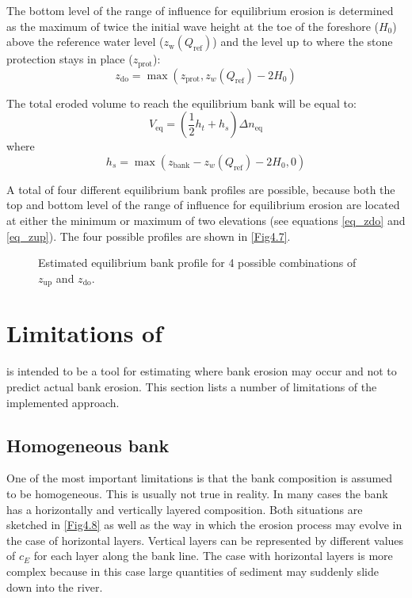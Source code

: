 The bottom level of the range of influence for equilibrium erosion is determined as the maximum of twice the initial wave height at the toe of the foreshore ($H_0$) above the reference water level ($z_\text{w}(Q_\text{ref})$) and the level up to where the stone protection stays in place ($z_\text{prot}$):
\begin{equation}
z_\text{do} = \max (z_\text{prot}, z_w(Q_\text{ref}) - 2 H_0 )
\label{eq_zdo}
\end{equation}

The total eroded volume to reach the equilibrium bank will be equal to:
\begin{equation}
V_\text{eq} = ( \frac{1}{2} h_t + h_s ) \Delta n_\text{eq}
\end{equation}
where
\begin{equation}
h_s = \max ( z_\text{bank} - z_w(Q_\text{ref}) - 2 H_0, 0)
\end{equation}

A total of four different equilibrium bank profiles are possible, because both the top and bottom level of the range of influence for equilibrium erosion are located at either the minimum or maximum of two elevations (see equations \autoref{eq_zdo} and \autoref{eq_zup}). The four possible profiles are shown in \autoref{Fig4.7}.
\begin{figure}[!h]
\center
\resizebox{14cm}{!}{
   
}
\caption{Estimated equilibrium bank profile for 4 possible combinations of $z_\text{up}$ and $z_\text{do}$.}
\label{Fig4.7}
\end{figure}

\section{Limitations of \dfastbe} \label{Sec4.7}

\dfastbe is intended to be a tool for estimating where bank erosion may occur and not to predict actual bank erosion.
This section lists a number of limitations of the implemented approach.

\subsection{Homogeneous bank}

One of the most important limitations is that the bank composition is assumed to be homogeneous.
This is usually not true in reality.
In many cases the bank has a horizontally and vertically layered composition.
Both situations are sketched in \autoref{Fig4.8} as well as the way in which the erosion process may evolve in the case of horizontal layers.
Vertical layers can be represented by different values of $c_E$ for each layer along the bank line.
The case with horizontal layers is more complex because in this case large quantities of sediment may suddenly slide down into the river.

